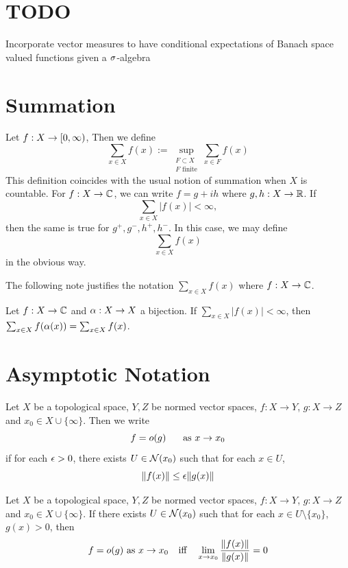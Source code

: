 \documentclass{book}
\begin{document}
	\newpage
		\chapter{TODO}
	Incorporate vector measures to have conditional expectations of Banach space valued functions given a $\sigma$-algebra
	

	
	
	

\appendix

\chapter{Summation}

\begin{defn} \ld{}
	Let $f:X \rightarrow [0,\infty)$, Then we define $$\sum_{x \in X} f(x) := \sup_{\substack{F \subset X \\ F \text{ finite}}} \sum_{x \in F} f(x)$$ This definition coincides with the usual notion of summation when $X$ is countable. For $f:X \rightarrow \mathbb{C}$, we can write $f = g +ih$ where $g,h:X \rightarrow \mathbb{R}$. If $$\sum_{x \in X}|f(x)| < \infty,$$ then the same is true for $g^+,g^-,h^+,h^-$. In this case, we may define $$\sum_{x \in X} f(x)$$ in the obvious way.
\end{defn} 

The following note justifies the notation $\sum_{x \in X}f(x)$ where $f:X \rightarrow \mathbb{C}$.

\begin{note}
	Let $f:X \rightarrow \mathbb{C}$ and $\alpha:X \rightarrow X$ a bijection. If $\sum_{x \in X}|f(x)|< \infty$, then $\sum_{x \in X}f( \alpha (x)) = \sum_{x \in X}f(x) $.
\end{note}

\newpage	

\chapter{Asymptotic Notation}

\begin{defn} \ld{}
	Let $X$ be a topological space, $Y, Z$ be normed vector spaces, $f:X \rightarrow Y$, $g: X \rightarrow Z$ and $x_0 \in X \cup \{\infty\}$. Then we write $$f = o(g) \hspace{.5cm} \text{ as } x \rightarrow x_0$$ if for each $\epsilon >0$, there exists $U \in \mathcal{N}(x_0)$ such that for each $x \in U$, $$\|f(x)\| \leq \epsilon\|g(x)\|$$
\end{defn}

\begin{ex} \lex{}
	Let $X$ be a topological space, $Y, Z$ be normed vector spaces, $f:X \rightarrow Y$, $g: X \rightarrow Z$ and $x_0 \in X \cup \{\infty\}$. If there exists $U \in \mathcal{N}(x_0)$ such that for each $x \in U \setminus \{x_0\}$, $g(x) > 0$, then $$f = o(g) \text{ as } x \rightarrow x_0 \hspace{.25cm} \text{ iff } \hspace{.25cm}  \lim_{x \rightarrow x_0} \frac{\| f(x) \|}{\| g(x) \|} = 0$$
\end{ex}	
\end{document}
